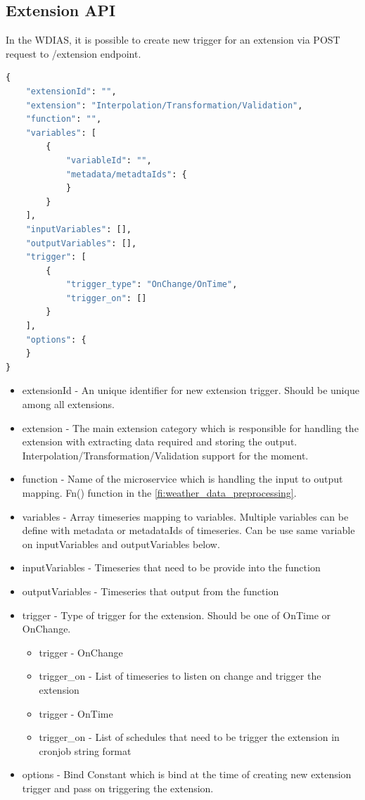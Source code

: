 \subsection{Extension API}
In the WDIAS, it is possible to create new trigger for an extension via POST request to /extension endpoint.
\begin{lstlisting}[language=Python]
{
    "extensionId": "",
    "extension": "Interpolation/Transformation/Validation",
    "function": "",
    "variables": [
        {
            "variableId": "",
            "metadata/metadtaIds": {
            }
        }
    ],
    "inputVariables": [],
    "outputVariables": [],
    "trigger": [
        {
            "trigger_type": "OnChange/OnTime",
            "trigger_on": []
        }
    ],
    "options": {
    }
}
\end{lstlisting}
\begin{itemize}
    \item extensionId - An unique identifier for new extension trigger. Should be unique among all extensions.
    \item extension - The main extension category which is responsible for handling the extension with extracting data required and storing the output. Interpolation/Transformation/Validation support for the moment.
    \item function - Name of the microservice which is handling the input to output mapping. Fn() function in the \ref{fi:weather_data_preprocessing}.
    \item variables - Array timeseries mapping to variables. Multiple variables can be define with metadata or metadataIds of timeseries. Can be use same variable on inputVariables and outputVariables below.
    \item inputVariables - Timeseries that need to be provide into the function
    \item outputVariables - Timeseries that output from the function
    \item trigger - Type of trigger for the extension. Should be one of OnTime or OnChange.
    \begin{itemize}
        \item trigger - OnChange
        \item trigger\_on - List of timeseries to listen on change and trigger the extension
    \end{itemize}
    \begin{itemize}
        \item trigger - OnTime
        \item trigger\_on - List of schedules that need to be trigger the extension in cronjob string format
    \end{itemize}
    \item options - Bind Constant which is bind at the time of creating new extension trigger and pass on triggering the extension.
\end{itemize}

